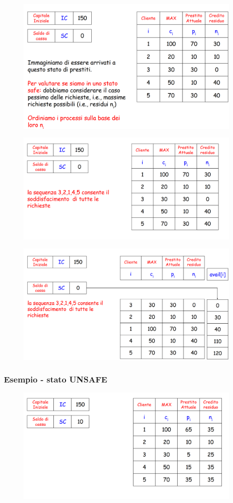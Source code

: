 \begin{figure} [h]
    \centering
    \includegraphics[width=0.7\linewidth]{Images/Screenshot 2025-01-15 113840.png}
\end{figure}

\begin{figure} [h]
    \centering
    \includegraphics[width=0.7\linewidth]{Images/Screenshot 2025-01-15 114120.png}
\end{figure}

\begin{figure} [h]
    \centering
    \includegraphics[width=0.7\linewidth]{Images/Screenshot 2025-01-15 114202.png}
\end{figure}

\newpage

\subsubsection{Esempio - stato UNSAFE} 

\begin{figure} [h]
    \centering
    \includegraphics[width=0.7\linewidth]{Images/Screenshot 2025-01-15 114320.png}
\end{figure}

